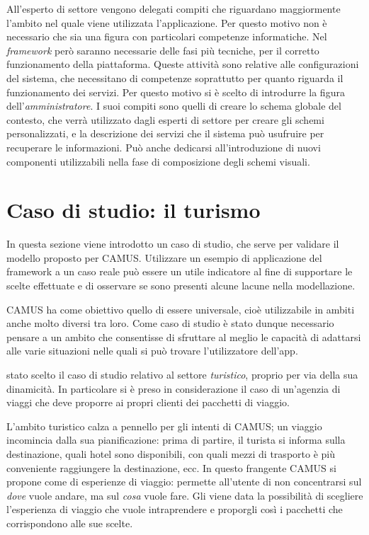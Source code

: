 All'esperto di settore vengono delegati compiti che riguardano maggiormente l'ambito nel quale viene utilizzata l'applicazione. Per questo motivo non è necessario che sia una figura con particolari competenze informatiche. Nel \emph{framework} però saranno necessarie delle fasi più tecniche, per il corretto funzionamento della piattaforma. Queste attività sono relative alle configurazioni del sistema, che necessitano di competenze soprattutto per quanto riguarda il funzionamento dei servizi. Per questo motivo si è scelto di introdurre la figura dell'\emph{amministratore}. I suoi compiti sono quelli di creare lo schema globale del contesto, che verrà utilizzato dagli esperti di settore per creare gli schemi personalizzati, e la descrizione dei servizi che il sistema può usufruire per recuperare le informazioni. Può anche dedicarsi all'introduzione di nuovi componenti utilizzabili nella fase di composizione degli schemi visuali.

\section{Caso di studio: il turismo\label{sec:caso-studio-turismo}}

In questa sezione viene introdotto un caso di studio, che serve per validare il modello proposto per CAMUS. Utilizzare un esempio di applicazione del framework a un caso reale può essere un utile indicatore al fine di supportare le scelte effettuate e di osservare se sono presenti alcune lacune nella modellazione.

CAMUS ha come obiettivo quello di essere universale, cioè utilizzabile in ambiti anche molto diversi tra loro. Come caso di studio è stato dunque necessario pensare a un ambito che consentisse di sfruttare al meglio le capacità di adattarsi alle varie situazioni nelle quali si può trovare l'utilizzatore dell'app.

\upe stato scelto il caso di studio relativo al settore \emph{turistico}, proprio per via della sua dinamicità. In particolare si è preso in considerazione il caso di un'agenzia di viaggi che deve proporre ai propri clienti dei pacchetti di viaggio.

L'ambito turistico calza a pennello per gli intenti di CAMUS; un viaggio incomincia dalla sua pianificazione: prima di partire, il turista si informa sulla destinazione, quali hotel sono disponibili, con quali mezzi di trasporto è più conveniente raggiungere la destinazione, ecc. In questo frangente CAMUS si propone come  di esperienze di viaggio: permette all'utente di non concentrarsi sul \emph{dove} vuole andare, ma sul \emph{cosa} vuole fare. Gli viene data la possibilità di scegliere l'esperienza di viaggio che vuole intraprendere e proporgli così i pacchetti che corrispondono alle sue scelte.

